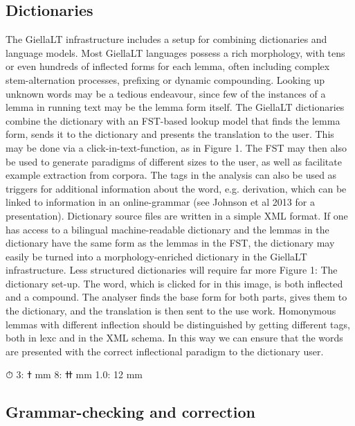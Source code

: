 \documentclass[free]{flammie}
\begin{document}
\subsection{Dictionaries}

The GiellaLT infrastructure includes a setup for combining dictionaries and language models. Most GiellaLT languages possess a rich morphology, with tens or even hundreds of
inflected forms for each lemma, often including complex stem-alternation processes, prefixing or dynamic compounding. Looking up unknown words may be a tedious endeavour,
since few of the instances of a lemma in running text may be the lemma form itself.
The GiellaLT dictionaries combine the dictionary with an FST-based lookup model that
finds the lemma form, sends it to the dictionary and presents the translation to the user.
This may be done via a click-in-text-function, as in Figure 1.
The FST may then also be used to generate paradigms of different sizes to the user, as well
as facilitate example extraction from corpora. The tags in the analysis can also be used as
triggers for additional information about the word, e.g. derivation, which can be linked to
information in an online-grammar (see Johnson et al 2013 for a presentation).
Dictionary source files are written in a simple XML format. If one has access to a bilingual machine-readable dictionary and the lemmas in the dictionary have the same form as
the lemmas in the FST, the dictionary may easily be turned into a morphology-enriched
dictionary in the GiellaLT infrastructure. Less structured dictionaries will require far more
Figure 1: The dictionary set-up. The word, which is clicked for in this image, is both inflected and a compound. The analyser finds the base form for both parts, gives them to the
dictionary, and the translation is then sent to the use
work. Homonymous lemmas with different inflection should be distinguished by getting
different tags, both in lexc and in the XML schema. In this way we can ensure that the
words are presented with the correct inflectional paradigm to the dictionary user.

⏱
ߙ :3 mm
ߚ :8 mm
1.0: 12 mm

\subsection{Grammar-checking and correction}
\end{document}
